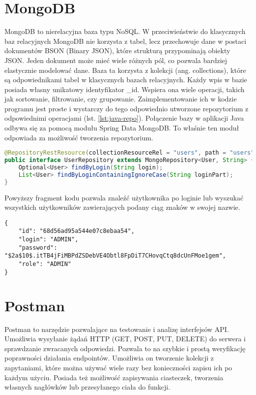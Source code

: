 \section{MongoDB}
MongoDB to nierelacyjna baza typu NoSQL. W przeciwieństwie do klasycznych baz relacyjnych MongoDB nie korzysta z tabel, lecz przechowuje dane w postaci dokumentów BSON (Binary JSON), które strukturą przypominają obiekty JSON.
Jeden dokument może mieć wiele różnych pól, co pozwala bardziej elastycznie modelować dane. Baza ta korzysta z kolekcji (ang. collections), które są odpowiednikami tabel w klasycznych bazach relacyjnych. Każdy wpis w bazie posiada własny unikatowy identyfikator \_id. Wspiera ona wiele operacji, takich jak sortowanie, filtrowanie, czy grupowanie. Zaimplementowanie ich w kodzie programu jest proste i wystarczy do tego odpowiednio utworzone repozytorium z odpowiednimi operacjami (lst. \ref{lst:java-repo}). Połączenie bazy w aplikacji Java odbywa się za pomocą modułu Spring Data MongoDB. To właśnie ten moduł odpowiada za możliwość tworzenia repozytorium.
\begin{lstlisting}[language={Java}, caption={Przykładowe repozytorium w Javie}, label={lst:java-repo}]
@RepositoryRestResource(collectionResourceRel = "users", path = "users")
public interface UserRepository extends MongoRepository<User, String> {
	Optional<User> findByLogin(String login);
	List<User> findByLoginContainingIgnoreCase(String loginPart);	
}	
\end{lstlisting}
Powyższy fragment kodu pozwala znaleźć użytkownika po loginie lub wyszukać wszystkich użytkowników zawierających podany ciąg znaków w swojej nazwie.
\begin{lstlisting}[caption={Przykladowy dokument z kolekcji}, label={lst:MongoDB-doc}]
{
	"id": "68d56ad95a544e07c8ebaa54",
	"login": "ADMIN",
	"password": "$2a$10$.itTB4jFiMBPdZSDebVE4Obtl8FpDiT7CHovqCtq8dcUnFMoe1gem",
	"role": "ADMIN"
}
\end{lstlisting}

\section{Postman}
Postman to narzędzie pozwalające na testowanie i analizę interfejsów API. Umożliwia wysyłanie żądań HTTP (GET, POST, PUT, DELETE) do serwera i sprawdzanie zwracanych odpowiedzi. Pozwala to na szybkie i prostą weryfikację poprawności działania endpointów. Umożliwia on tworzenie kolekcji z zapytaniami, które można używać wiele razy bez konieczności zapisu ich po każdym użyciu. Posiada też możliwość zapisywania ciasteczek, tworzenia własnych nagłówków lub przesyłanego ciała do funkcji. 
